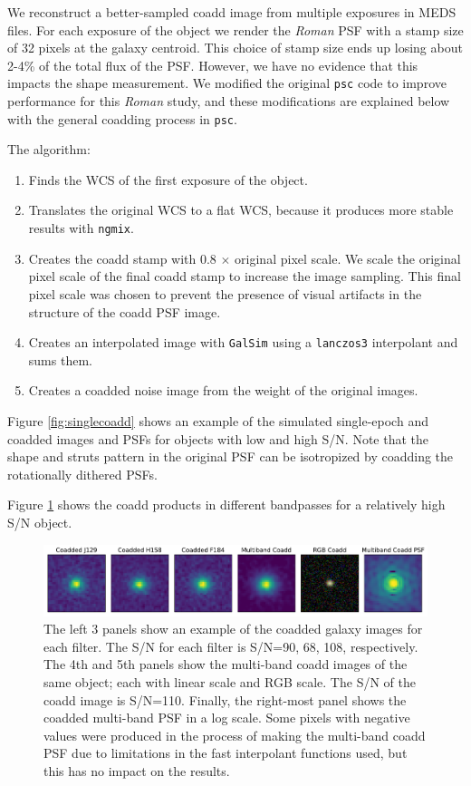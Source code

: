 \documentclass[fleqn,usenatbib]{mnras}
\begin{document}
We reconstruct a better-sampled coadd image from multiple exposures in MEDS files. For each exposure of the object we render the \emph{Roman} PSF with a stamp size of 32 pixels at the galaxy centroid. This choice of stamp size ends up losing about 2-4\% of the total flux of the PSF. However, we have no evidence that this impacts the shape measurement. We modified the original \texttt{psc} code to improve performance for this \emph{Roman} study, and these modifications are explained below with the general coadding process in \texttt{psc}. 

The algorithm: 
\begin{enumerate}
    \setlength\itemsep{1em}
    \item Finds the WCS of the first exposure of the object.
    \item Translates the original WCS to a flat WCS, because it produces more stable results with \texttt{ngmix}.
    \item Creates the coadd stamp with 0.8 $\times$ original pixel scale. We scale the original pixel scale of the final coadd stamp to increase the image sampling. This final pixel scale was chosen to prevent the presence of visual artifacts in the structure of the coadd PSF image. 
    \item Creates an interpolated image with \texttt{GalSim}  using a \texttt{lanczos3} interpolant and sums them. 
    \item Creates a coadded noise image from the weight of the original images. 
\end{enumerate}
Figure \ref{fig:singlecoadd} shows an example of the simulated single-epoch and coadded images and PSFs for objects with low and high S/N. Note that the shape and struts pattern in the original PSF can be isotropized by coadding the rotationally dithered PSFs. 


Figure \ref{fig:single_to_coadd_rgb} shows the coadd products in different bandpasses for a relatively high S/N object.

\begin{figure}
	\includegraphics[width=\textwidth]{coadd_galaxy_example_log_v2.pdf}
    \caption{The left 3 panels show an example of the coadded galaxy images for each filter. The S/N for each filter is S/N=90, 68, 108, respectively. The 4th and 5th panels show the multi-band coadd images of the same object; each with linear scale and RGB scale. The S/N of the coadd image is S/N=110. Finally, the right-most panel shows the coadded multi-band PSF in a log scale. Some pixels with negative values were produced in the process of making the multi-band coadd PSF due to limitations in the fast interpolant functions used, but this has no impact on the results. }
    \label{fig:single_to_coadd_rgb}
\end{figure}
\end{document}
